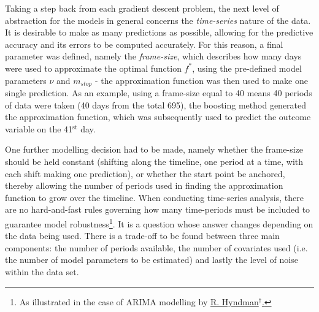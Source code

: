 \documentclass{article}
\begin{document}
Taking a step back from each gradient descent problem, the next level of abstraction for the models in general concerns the \emph{time-series} nature of the data. It is desirable to make as many predictions as possible, allowing for the predictive accuracy and its errors to be computed accurately. For this reason, a final parameter was defined, namely the \emph{frame-size}, which describes how many days were used to approximate the optimal function $f^*$, using the pre-defined model parameters $\nu$ and $m_{stop}$ - the approximation function was then used to make one single prediction. As an example, using a frame-size equal to 40 means 40 periods of data were taken (40 days from the total 695), the boosting method generated the approximation function, which was subsequently used to predict the outcome variable on the 41$^{\text{st}}$ day.

One further modelling decision had to be made, namely whether the frame-size should be held constant (shifting along the timeline, one period at a time, with each shift making one prediction), or whether the start point be anchored, thereby allowing the number of periods used in finding the approximation function to grow over the timeline. When conducting time-series analysis, there are no hard-and-fast rules governing how many time-periods must be included to guarantee model robustness\footnote{As illustrated in the case of ARIMA modelling by \href{http://robjhyndman.com/hyndsight/short-time-series/}{R. Hyndman$^{\dag{}}$.}}. It is a question whose answer changes depending on the data being used. There is a trade-off to be found between three main components: the number of periods available, the number of covariates used (i.e. the number of model parameters to be estimated) and lastly the level of noise within the data set.
\end{document}
